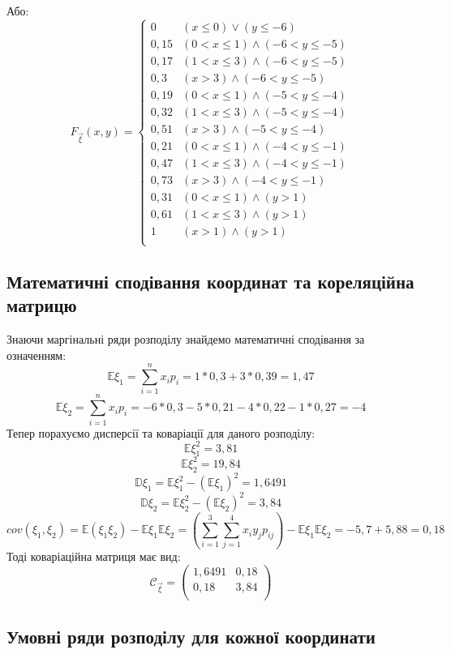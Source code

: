\documentclass{article}
\begin{document}
	Або:
	$$F_{\overrightarrow{\xi}}(x, y) = 
	\begin{cases}
		0    & (x\leq0) \vee (y\leq-6) \\
		0,15 & (0 < x \leq 1) \wedge (-6 < y \leq -5) \\
		0,17 & (1 < x \leq 3) \wedge (-6 < y \leq -5) \\
		0,3  & (x > 3) \wedge (-6 < y \leq -5) \\
		0,19 & (0 < x \leq 1) \wedge (-5 < y \leq -4) \\
		0,32 & (1 < x \leq 3) \wedge (-5 < y \leq -4) \\
		0,51 & ( x > 3 ) \wedge (-5 < y \leq -4) \\
		0,21 & (0 < x \leq 1) \wedge (-4 < y \leq -1) \\ 
		0,47 & (1 < x \leq 3) \wedge (-4 < y \leq -1) \\ 
		0,73 & (x > 3) \wedge (-4 < y \leq -1) \\ 
		0,31 & (0 < x \leq 1) \wedge (y > 1) \\ 
		0,61 & (1 < x \leq 3) \wedge (y > 1) \\ 
		1    & (x > 1) \wedge (y > 1) \\
		
	\end{cases}
	$$
	\newpage
	\subsection{Математичні сподівання координат та кореляційна матрицю}
	Знаючи маргінальні ряди розподілу знайдемо математичні сподівання за означенням:
	$$\mathbb{E}\xi_1 = \sum_{i=1}^{n}x_ip_i = 1 * 0,3 + 3 * 0,39 = 1,47$$
	$$\mathbb{E}\xi_2 = \sum_{i=1}^{n}x_ip_i = -6 * 0,3 - 5 * 0,21 - 4 * 0,22 - 1 * 0,27=-4$$
	Тепер порахуємо дисперсії та коваріації для даного розподілу:
	$$\mathbb{E}\xi_1^2 = 3,81$$	
	$$\mathbb{E}\xi_2^2 = 19,84$$
	$$\mathbb{D}\xi_1 = \mathbb{E}\xi_1^2 - (\mathbb{E}\xi_1)^2 = 1,6491$$
	$$\mathbb{D}\xi_2 = \mathbb{E}\xi_2^2 - (\mathbb{E}\xi_2)^2 = 3,84$$
	$$cov(\xi_1, \xi_2) =  \mathbb{E}(\xi_1\xi_2) - \mathbb{E}\xi_1 \mathbb{E}\xi_2 = 
	(\sum_{i=1}^{3}\sum_{j=1}^{4}x_iy_jp_{ij}) - \mathbb{E}\xi_1 \mathbb{E}\xi_2 = 
	-5,7+5,88 = 0,18$$
	Тоді коваріаційна матриця має вид:
	$$ \mathcal{C}_{\overrightarrow{\xi}} = 
	\left(\begin{matrix}
		1,6491 & 0,18 \\
		0,18   & 3,84 \\
	\end{matrix}\right)
	$$
	\subsection{Умовні ряди розподілу для кожної координати}
	
\end{document}
